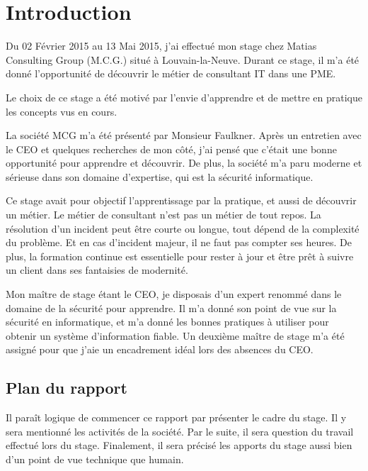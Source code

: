 \chapter*{Introduction}
Du 02 Février 2015 au 13 Mai 2015, j'ai effectué mon stage chez Matias Consulting Group (M.C.G.) situé à Louvain-la-Neuve.
Durant ce stage, il m'a été donné l'opportunité de découvrir le métier de consultant IT dans une PME.

Le choix de ce stage a été motivé par l'envie d'apprendre et de mettre en pratique les concepts vus en cours.

La société MCG m'a été présenté par Monsieur Faulkner.
Après un entretien avec le CEO et quelques recherches de mon côté, j'ai pensé que c'était une bonne opportunité pour apprendre et découvrir. 
De plus, la société m'a paru moderne et sérieuse dans son domaine d'expertise, qui est la sécurité informatique.

Ce stage avait pour objectif l'apprentissage par la pratique, et aussi de découvrir un métier.
Le métier de consultant n'est pas un métier de tout repos.
La résolution d'un incident peut être courte ou longue, tout dépend de la complexité du problème.
Et en cas d'incident majeur, il ne faut pas compter ses heures.
De plus, la formation continue est essentielle pour rester à jour et être prêt à suivre un client dans ses fantaisies de modernité. 

Mon maître de stage étant le CEO, je disposais d'un expert renommé dans le domaine de la sécurité pour apprendre.
Il m'a donné son point de vue sur la sécurité en informatique, et m'a donné les bonnes pratiques à utiliser pour obtenir un système d'information fiable.
Un deuxième maître de stage m'a été assigné pour que j'aie un encadrement idéal lors des absences du CEO. 

\section*{Plan du rapport}
Il paraît logique de commencer ce rapport par présenter le cadre du stage.
Il y sera mentionné les activités de la société.
Par le suite, il sera question du travail effectué lors du stage.
Finalement, il sera précisé les apports du stage aussi bien d'un point de vue technique que humain.